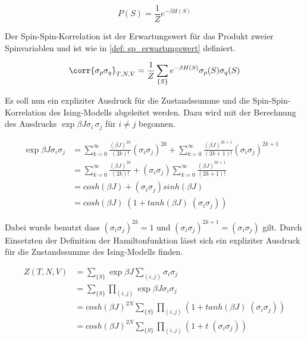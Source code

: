 \begin{equation} \label{eq: konfigProb}
    P(S) = \frac{1}{Z} e^{-\beta H( S ) } 
\end{equation}

\noindent Der Spin-Spin-Korrelation ist der Erwartungswert für das Produkt zweier Spinvariablen und ist wie in \eqref{def: sp_erwartungswert} definiert.

\begin{equation} \label{def: sp_erwartungswert}
    \corr{\sigma_{p} \sigma_{q}}_{T,N,V} = \frac{1}{Z} \sum_{\{S\}} e^{-\beta H( S ) }  \sigma_{p}( S ) \sigma_{q}( S )
\end{equation}

 \noindent Es soll nun ein expliziter Ausdruck für die Zustandssumme und die Spin-Spin-Korrelation des Ising-Modells abgeleitet werden. Dazu wird mit der Berechnung des Ausdrucks $\exp{\beta J \sigma_i \, \sigma_j} $ für $i \neq j$ begonnen.

\begin{align}
\exp{\beta J \sigma_i \sigma_j} & = \sum_{k=0}^{\infty} \frac{(\beta J)^{2k}}{(2k)!}(\sigma_i \sigma_j)^{2k} + \sum_{k=0}^{\infty} \frac{(\beta J)^{2k+1}}{(2k+1)!}(\sigma_i \sigma_j)^{2k+1}  &\\
& = \sum_{k=0}^{\infty} \frac{(\beta J)^{2k}}{(2k)!} + (\sigma_i \sigma_j) \sum_{k=0}^{\infty} \frac{(\beta J)^{2k+1}}{(2k+1)!} &\\
& = cosh(\beta J) + (\sigma_i \sigma_j) sinh(\beta J) &\\
& = cosh(\beta J) \; (1 +  tanh(\beta J) \; (\sigma_i \sigma_j)) \label{eq: exp(beta J sig sig)}
\end{align}

\noindent Dabei wurde benutzt dass $(\sigma_i \sigma_j)^{2k} = 1$ und $(\sigma_i \sigma_j)^{2k+1} = (\sigma_i \sigma_j)$ gilt. Durch Einsetzten der Definition der Hamiltonfunktion lässt sich ein expliziter Ausdruck für die Zustandssumme des Ising-Modells finden. 

\begin{align} 
    Z(T,N,V) 
    &  = \sum_{\{S\}} \exp{\beta J \sum_{(i,j)} \sigma_i \sigma_j } \\
    &  = \sum_{\{S\}} \prod_{(i,j)} \exp{\beta J \sigma_i \sigma_j } \\
    &  = cosh(\beta J)^{2N} \sum_{\{S\}} \prod_{(i,j)} (1 +  tanh(\beta J) \; (\sigma_i \sigma_j)) \\
    &  = cosh(\beta J)^{2N} \sum_{\{S\}} \prod_{(i,j)} (1 +  t \; (\sigma_i \sigma_j))
\end{align}

